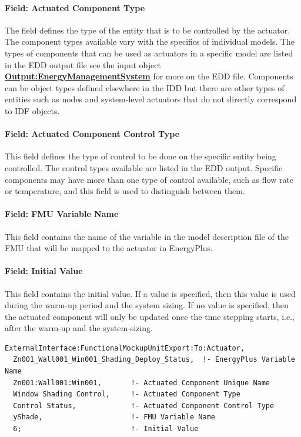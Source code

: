 \paragraph{Field: Actuated Component Type}\label{field-actuated-component-type-2}

The field defines the type of the entity that is to be controlled by the actuator. The component types available vary with the specifics of individual models. The types of components that can be used as actuators in a specific model are listed in the EDD output file see the input object \textbf{\hyperref[outputenergymanagementsystem]{Output:EnergyManagementSystem}} for more on the EDD file. Components can be object types defined elsewhere in the IDD but there are other types of entities such as nodes and system-level actuators that do not directly correspond to IDF objects.

\paragraph{Field: Actuated Component Control Type}\label{field-actuated-component-control-type-2}

This field defines the type of control to be done on the specific entity being controlled. The control types available are listed in the EDD output. Specific components may have more than one type of control available, such as flow rate or temperature, and this field is used to distinguish between them.

\paragraph{Field: FMU Variable Name}\label{field-fmu-variable-name-6}

This field contains the name of the variable in the model description file of the FMU that will be mapped to the actuator in EnergyPlus.

\paragraph{Field: Initial Value}\label{field-initial-value-7}

This field contains the initial value. If a value is specified, then this value is used during the warm-up period and the system sizing. If no value is specified, then the actuated component will only be updated once the time stepping starts, i.e., after the warm-up and the system-sizing.

\begin{lstlisting}
ExternalInterface:FunctionalMockupUnitExport:To:Actuator,
  Zn001_Wall001_Win001_Shading_Deploy_Status,  !- EnergyPlus Variable Name
  Zn001:Wall001:Win001,       !- Actuated Component Unique Name
  Window Shading Control,     !- Actuated Component Type
  Control Status,             !- Actuated Component Control Type
  yShade,                     !- FMU Variable Name
  6;                          !- Initial Value
\end{lstlisting}

